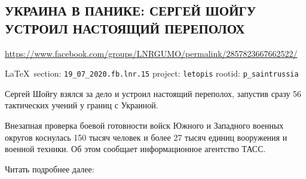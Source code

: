  
 
\subsection{УКРАИНА В ПАНИКЕ: СЕРГЕЙ ШОЙГУ УСТРОИЛ НАСТОЯЩИЙ ПЕРЕПОЛОХ}
\url{https://www.facebook.com/groups/LNRGUMO/permalink/2857823667662522/}
  
\vspace{0.5cm}
{\small\LaTeX~section: \verb|19_07_2020.fb.lnr.15| project: \verb|letopis| rootid: \verb|p_saintrussia|}
\vspace{0.5cm}
 
Сергей Шойгу взялся за дело и устроил настоящий переполох, запустив сразу 56 тактических учений у границ с Украиной.

Внезапная проверка боевой готовности войск Южного и Западного военных округов коснулась 150 тысяч человек и более 27 тысяч единиц вооружения и военной техники. Об этом сообщает информационное агентство ТАСС.

Читать подробнее далее: 
